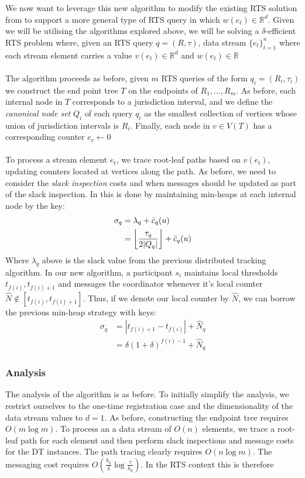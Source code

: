 \documentclass{article}
\begin{document}
We now want to leverage this new algorithm to modify the existing RTS solution from \cite{Gan2016} to support a more general type of RTS query in which $w(e_t) \in \mathbb{R}^d$. Given we will be utilising the algorithms explored above, we will be solving a $\delta$-efficient RTS problem where, given an RTS query $q = (R, \tau)$, data stream $\{e_t\}_{t=1}^{n}$ where each stream element carries a value $v(e_t)\in\mathbb{R}^d$ and $w(e_t)\in\mathbb{R}$ \\
\\
The algorithm proceeds as before, given $m$ RTS queries of the form $q_i = (R_i, \tau_i)$ we construct the end point tree $T$ on the endpoints of $R_1,\dots,R_m$. As before, each internal node in $T$ corresponds to a jurisdiction interval, and we define the \textit{canonical node set} $Q_i$ of each query $q_i$ as the smallest collection of vertices whose union of jurisdiction intervals is $R_i$. Finally, each node in $v\in V(T)$ has a corresponding counter $c_v \leftarrow 0$\\
\\
To process a stream element $e_t$, we trace root-leaf paths based on $v(e_t)$, updating counters located at vertices along the path. As before, we need to consider the \textit{slack inspection} costs and when messages should be updated as part of the slack inspection. In \cite{Gan2016} this is done by maintaining min-heaps at each internal node by the key:
\begin{align*}
    \sigma_q &= \lambda_q + \Bar{c}_q(u) \\
              &= \left\lfloor \frac{\tau_q}{2|Q_q|}\right\rfloor + \Bar{c}_{q}(u)
\end{align*}
Where $\lambda_q$ above is the slack value from the previous distributed tracking algorithm. In our new algorithm, a participant $s_i$ maintains local thresholds $t_{f(i)}, t_{f(i)+1}$ and messages the coordinator whenever it's local counter $\hat{N}\notin [t_{f(i)}, t_{f(i)+1}]$. Thus, if we denote our local counter by $\hat{N}$, we can borrow the previous min-heap strategy with keys: 
\begin{align*}
    \sigma_q &= |t_{f(i)+1} - t_{f(i)}| + \hat{N}_q \\
    &= \delta(1+\delta)^{f(i)-1} +\hat{N}_q
\end{align*}

\subsubsection*{Analysis}
The analysis of the algorithm is as before. To initially simplify the analysis, we restrict ourselves to the one-time registration case and the dimensionality of the data stream values to $d=1$. As before, constructing the endpoint tree requires $O(m\log m)$. To process an a data stream of $O(n)$ elements, we trace a root-leaf path for each element and then perform slack inspections and message costs for the DT instances. The path tracing clearly requires $O(n\log m)$. The messaging cost requires $O(\frac{h_q}{\delta}\log \frac{\tau}{h_q})$. In the RTS context this is therefore 
\end{document}
